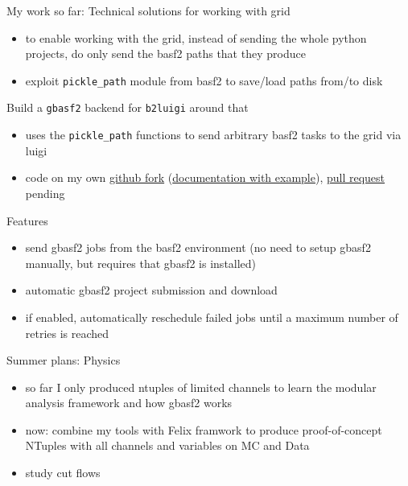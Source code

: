 \documentclass[aspectratio=169, 12pt]{beamer}
\begin{document}
\begin{frame}[label={sec:org01a945a},fragile]{My work so far: Technical solutions for working with grid}
 \begin{itemize}
\item to enable working with the grid, instead of sending the whole python projects,
do only send the basf2 paths that they produce
\item exploit \texttt{pickle\_path} module from basf2 to save/load paths from/to disk
\end{itemize}
\begin{center}

\end{center}
\end{frame}
\begin{frame}[label={sec:org28a79f3},fragile]{Build a \texttt{gbasf2} backend for \texttt{b2luigi} around that}
 \begin{itemize}
\item uses the \texttt{pickle\_path} functions to send arbitrary basf2 tasks to the grid via luigi
\item code on my own \href{https://github.com/meliache/b2luigi/tree/feature/gbasf2-wrapper-batch-process}{github fork} (\href{https://meliache.github.io/b2luigi/docs/\_build/html/usage/batch.html\#gbasf2-wrapper-for-lcg}{documentation with example}), \href{https://github.com/nils-braun/b2luigi/pull/32}{pull request} pending
\end{itemize}
\begin{block}{Features}
\begin{itemize}
\item send gbasf2 jobs from the basf2 environment (no need to setup gbasf2
manually, but requires that gbasf2 is installed)
\item automatic gbasf2 project submission and download
\item if enabled, automatically reschedule failed jobs until a maximum number of
retries is reached
\end{itemize}
\end{block}
\end{frame}


\begin{frame}[label={sec:org9c6238f}]{Summer plans: Physics}
\begin{itemize}
\item so far I only produced ntuples of limited channels to learn the modular analysis
framework and how gbasf2 works
\item now: combine my tools with Felix framwork to produce proof-of-concept NTuples
with all channels and variables on MC and Data
\item study cut flows
\end{itemize}
\end{frame}
\end{document}
